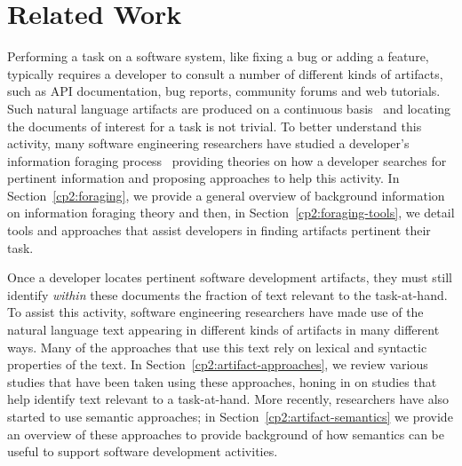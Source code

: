 \setcounter{chapter}{1}


\chapter{Related Work}
\label{ch:related-work}




Performing a task on a software system, like fixing a bug
or adding a feature, typically requires a developer to consult
a number of different kinds of artifacts, such
as API documentation, bug reports, community forums
and web tutorials. 
Such natural language artifacts are produced on a 
continuous basis~\cite{Rastkar2013t} 
and locating the documents of interest for a task
is not trivial. 
To better understand this activity, 
many software engineering researchers 
have studied  a developer's information foraging process~\cite{Pirolli1999}
providing theories on how a developer searches for pertinent information
and proposing approaches to help this activity.
In Section~\ref{cp2:foraging},
we provide a general overview of background information on 
information foraging theory and 
then, in Section~\ref{cp2:foraging-tools}, we detail tools and approaches that 
assist  developers in finding artifacts pertinent their task.



Once a developer locates pertinent
software development artifacts, 
they must still identify \textit{within} these documents 
the fraction of text relevant to the task-at-hand.
To assist this activity, software engineering researchers have made use of the natural language
text appearing in different kinds of artifacts  in many different ways.
Many of the approaches that
use this text rely on lexical and syntactic properties of the text. 
In Section~\ref{cp2:artifact-approaches}, we review various studies that have been taken using these approaches,
honing in on studies that help identify text relevant to a task-at-hand.
More recently, researchers have also started to use semantic approaches; 
in Section~\ref{cp2:artifact-semantics} we 
provide an overview of these approaches to provide background of
how semantics can be useful to support software development activities.



\clearpage




% 
% 
% 